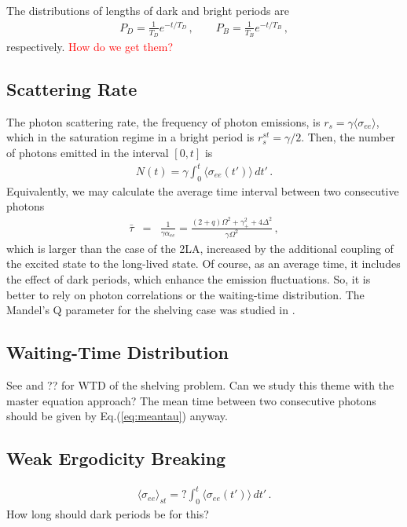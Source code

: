 \documentclass[twocolumn,aps,eqsecnum,showkeys,amsmath]{revtex4-2}
\begin{document}
The distributions of lengths of dark and bright periods are 
%
\begin{eqnarray}    
P_D = \frac{1}{T_D} e^{-t/T_D}	 \,, 	\qquad 
	P_B = \frac{1}{T_B} e^{-t/T_B}	\,, 
\end{eqnarray}
respectively. \textcolor{red}{How do we get them?} 

\subsection{Scattering Rate} 
The photon scattering rate, the frequency of photon emissions, is 
$r_s =\gamma \langle \sigma_{ee} \rangle$, which in the saturation regime 
in a bright period is $r_s^{st}=\gamma/2$. Then, the number of photons 
emitted in the  interval $[0,t]$ is 
%
\begin{eqnarray} 
N(t) = \gamma \int_0^t \langle \sigma_{ee} (t') \rangle \, dt' \,.
\end{eqnarray}
Equivalently, we may calculate the average time interval between two 
consecutive photons 
%
\begin{eqnarray} 	\label{eq:meantau}
 \bar{\tau} &=& \frac{1}{\gamma \alpha_{ee} } 
	=\frac{(2 +q)\Omega^2 +\gamma_+^2 +4 \Delta^2}
	{\gamma \Omega^2} 	\,,		
\end{eqnarray}
which is larger than the case of the 2LA, increased by the additional coupling 
of the excited state to the long-lived state. Of course, as an average time, it 
includes the effect of dark periods, which enhance the emission fluctuations. 
So, it is better to rely on photon correlations or the waiting-time distribution. 
The Mandel's Q parameter for the shelving case was studied in 
\cite{MeSc90}.  

\subsection{Waiting-Time Distribution} 
See \cite{CTDa86} and ?? for WTD of the shelving problem. Can we study 
this theme with the master equation approach? The mean time between 
two consecutive photons should be given by Eq.(\ref{eq:meantau}) anyway.

\subsection{Weak Ergodicity Breaking} 
%
\begin{eqnarray} 
\langle \sigma_{ee} \rangle_{st} 
	=? \int_0^t \langle \sigma_{ee} (t') \rangle \, dt' \,.
\end{eqnarray}
How long should dark periods be for this?
\end{document}
